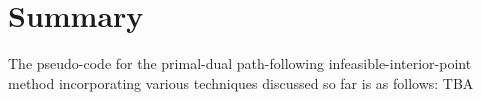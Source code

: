 \section{Summary}
The pseudo-code for the primal-dual path-following infeasible-interior-point method incorporating various techniques discussed so far is as follows:
TBA
